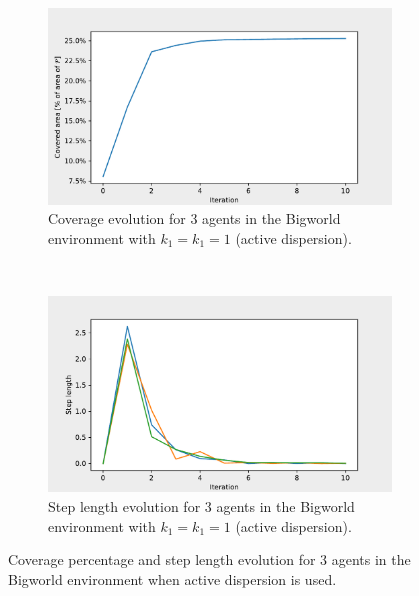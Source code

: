 \begin{figure}[H]
  \centering
  \begin{subfigure}[t]{0.5\textwidth}
    \centering
    \includegraphics[width=\textwidth]{figs/bigworld_3_agnt_k_1_1_k_2_1_area_traj.pdf}
    \caption{Coverage evolution for 3 agents in the Bigworld environment with $k_{1} = k_{1} = 1$ (active dispersion).}
    \label{fig:3_agnt_bw_k_1_1_a_traj}
  \end{subfigure}%
  ~ 
  \begin{subfigure}[t]{0.5\textwidth}
    \centering
    \includegraphics[width=\textwidth]{figs/bigworld_3_agnt_k_1_1_k_2_1_step_traj.pdf}
    \caption{Step length evolution for 3 agents in the Bigworld environment with $k_{1} = k_{1} = 1$ (active dispersion).}
    \label{fig:3_agnt_bw_k_1_1_s_traj}
  \end{subfigure}
  \caption{Coverage percentage and step length evolution for 3 agents in the Bigworld environment when active dispersion is used.}
  \label{fig:3_agnt_bw_evolution_active}
\end{figure}


